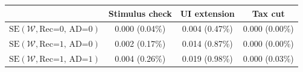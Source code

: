 \begin{tabular}{@{}lccc@{}}
\toprule
                          & Stimulus check      & UI extension    & Tax cut    \\  \midrule
$\mathrm{SE}(\mathcal{W}, \text{Rec=0, AD=0})$ & 0.000 (0.04\%)  & 0.004 (0.47\%)  & 0.000 (0.00\%)     \\
$\mathrm{SE}(\mathcal{W}, \text{Rec=1, AD=0})$ & 0.002 (0.17\%)  & 0.014 (0.87\%)  & 0.000 (0.00\%)     \\
$\mathrm{SE}(\mathcal{W}, \text{Rec=1, AD=1})$ & 0.004 (0.26\%)  & 0.019 (0.98\%)  & 0.000 (0.03\%)     \\ \bottomrule
\end{tabular}
